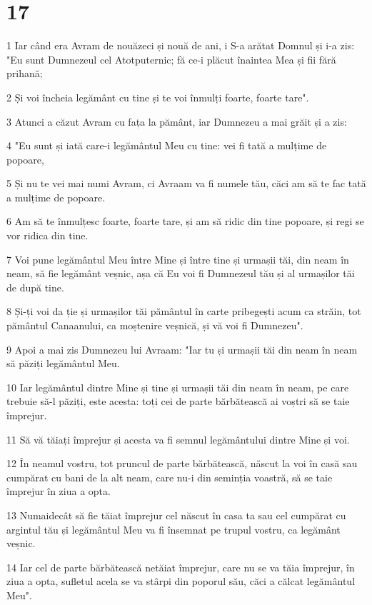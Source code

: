 \chapter{17}

\par 1 Iar când era Avram de nouăzeci și nouă de ani, i S-a arătat Domnul și i-a zis: "Eu sunt Dumnezeul cel Atotputernic; fă ce-i plăcut înaintea Mea și fii fără prihană;
\par 2 Și voi încheia legământ cu tine și te voi înmulți foarte, foarte tare".
\par 3 Atunci a căzut Avram cu fața la pământ, iar Dumnezeu a mai grăit și a zis:
\par 4 "Eu sunt și iată care-i legământul Meu cu tine: vei fi tată a mulțime de popoare,
\par 5 Și nu te vei mai numi Avram, ci Avraam va fi numele tău, căci am să te fac tată a mulțime de popoare.
\par 6 Am să te înmulțesc foarte, foarte tare, și am să ridic din tine popoare, și regi se vor ridica din tine.
\par 7 Voi pune legământul Meu între Mine și între tine și urmașii tăi, din neam în neam, să fie legământ veșnic, așa că Eu voi fi Dumnezeul tău și al urmașilor tăi de după tine.
\par 8 Și-ți voi da ție și urmașilor tăi pământul în carte pribegești acum ca străin, tot pământul Canaanului, ca moștenire veșnică, și vă voi fi Dumnezeu".
\par 9 Apoi a mai zis Dumnezeu lui Avraam: "Iar tu și urmașii tăi din neam în neam să păziți legământul Meu.
\par 10 Iar legământul dintre Mine și tine și urmașii tăi din neam în neam, pe care trebuie să-l păziți, este acesta: toți cei de parte bărbătească ai voștri să se taie împrejur.
\par 11 Să vă tăiați împrejur și acesta va fi semnul legământului dintre Mine și voi.
\par 12 În neamul vostru, tot pruncul de parte bărbătească, născut la voi în casă sau cumpărat cu bani de la alt neam, care nu-i din seminția voastră, să se taie împrejur în ziua a opta.
\par 13 Numaidecât să fie tăiat împrejur cel născut în casa ta sau cel cumpărat cu argintul tău și legământul Meu va fi însemnat pe trupul vostru, ca legământ veșnic.
\par 14 Iar cel de parte bărbătească netăiat împrejur, care nu se va tăia împrejur, în ziua a opta, sufletul acela se va stârpi din poporul său, căci a călcat legământul Meu".

